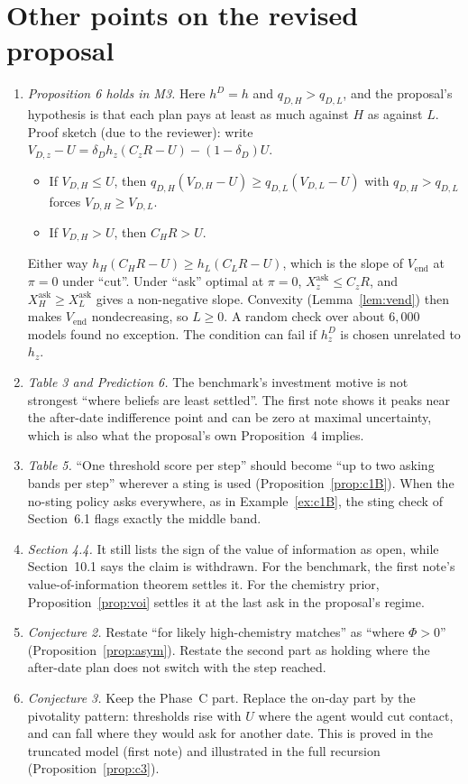 \documentclass[11pt,a4paper]{article}
\theoremstyle{definition}
\theoremstyle{remark}
\newcommand{\Vend}{V_{\mathrm{end}}}
\begin{document}
\section{Other points on the revised proposal}
\begin{enumerate}
\item \emph{Proposition 6 holds in M3.} Here $h^D=h$ and $q_{D,H}>q_{D,L}$, and the proposal's hypothesis is that each plan pays at least as much against $H$ as against $L$. Proof sketch (due to the reviewer): write $V_{D,z}-U=\delta_Dh_z(C_zR-U)-(1-\delta_D)U$.
\begin{itemize}[nosep]
\item If $V_{D,H}\le U$, then $q_{D,H}(V_{D,H}-U)\ge q_{D,L}(V_{D,L}-U)$ with $q_{D,H}>q_{D,L}$ forces $V_{D,H}\ge V_{D,L}$.
\item If $V_{D,H}>U$, then $C_HR>U$.
\end{itemize}
Either way $h_H(C_HR-U)\ge h_L(C_LR-U)$, which is the slope of $\Vend$ at $\pi=0$ under ``cut''. Under ``ask'' optimal at $\pi=0$, $X^{\text{ask}}_z\le C_zR$, and $X^{\text{ask}}_H\ge X^{\text{ask}}_L$ gives a non-negative slope. Convexity (Lemma~\ref{lem:vend}) then makes $\Vend$ nondecreasing, so $L\ge0$. A random check over about $6{,}000$ models found no exception. The condition can fail if $h^D_z$ is chosen unrelated to $h_z$.
\item \emph{Table 3 and Prediction 6.} The benchmark's investment motive is not strongest ``where beliefs are least settled''. The first note shows it peaks near the after-date indifference point and can be zero at maximal uncertainty, which is also what the proposal's own Proposition~4 implies.
\item \emph{Table 5.} ``One threshold score per step'' should become ``up to two asking bands per step'' wherever a sting is used (Proposition~\ref{prop:c1B}). When the no-sting policy asks everywhere, as in Example~\ref{ex:c1B}, the sting check of Section~6.1 flags exactly the middle band.
\item \emph{Section 4.4.} It still lists the sign of the value of information as open, while Section~10.1 says the claim is withdrawn. For the benchmark, the first note's value-of-information theorem settles it. For the chemistry prior, Proposition~\ref{prop:voi} settles it at the last ask in the proposal's regime.
\item \emph{Conjecture 2.} Restate ``for likely high-chemistry matches'' as ``where $\Phi>0$'' (Proposition~\ref{prop:asym}). Restate the second part as holding where the after-date plan does not switch with the step reached.
\item \emph{Conjecture 3.} Keep the Phase~C part. Replace the on-day part by the pivotality pattern: thresholds rise with $U$ where the agent would cut contact, and can fall where they would ask for another date. This is proved in the truncated model (first note) and illustrated in the full recursion (Proposition~\ref{prop:c3}).
\end{enumerate}
\end{document}
